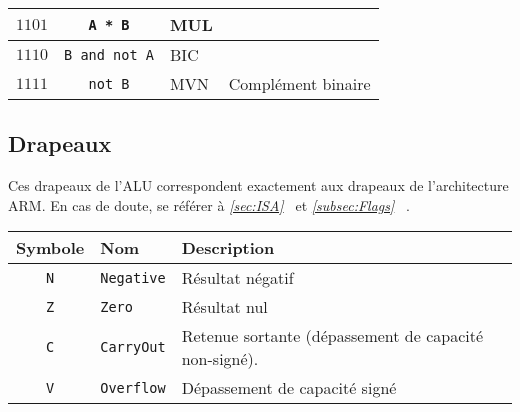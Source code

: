 \documentclass{article}
\begin{document}
\begin{tabular}{|r|c|l|l|}
        \hline
        $1101$         & \texttt{A * B}               & MUL                   &                                                    \\
        \hline
        $1110$         & \texttt{B and not A}         & BIC                   &                                                    \\
        \hline
        $1111$         & \texttt{not B}               & MVN                   & Complément binaire                                 \\
        \hline
    \end{tabular}

    \subsection{Drapeaux}

    Ces drapeaux de l'ALU correspondent exactement aux drapeaux de l'architecture ARM. En cas de doute, se référer à \textit{\ref{sec:ISA}~} et \textit{\ref{subsec:Flags}~} .

    \begin{tabular}{|c|l|l|}
        \hline
        \textbf{Symbole} & \textbf{Nom}      & \textbf{Description}                                  \\
        \hline

        \texttt{N}       & \texttt{Negative} & Résultat négatif                                      \\
        \hline
        \texttt{Z}       & \texttt{Zero}     & Résultat nul                                          \\
        \hline
        \texttt{C}       & \texttt{CarryOut} & Retenue sortante (dépassement de capacité non-signé). \\
        \hline
        \texttt{V}       & \texttt{Overflow} & Dépassement de capacité signé                         \\

        \hline
    \end{tabular}
\end{document}
